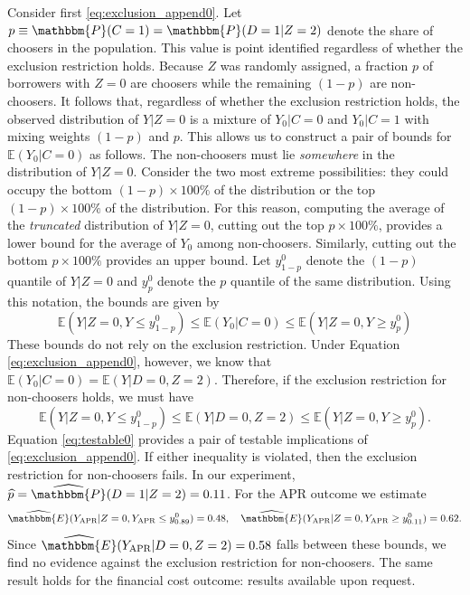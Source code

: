 \begin{appendix}
Consider first \eqref{eq:exclusion_append0}.
Let $p \equiv \mathbbm{P}(C=1) = \mathbbm{P}(D=1|Z=2)$ denote the share of choosers in the population.
This value is point identified regardless of whether the exclusion restriction holds.
Because $Z$ was randomly assigned, a fraction $p$ of borrowers with $Z=0$ are choosers while the remaining $(1-p)$ are non-choosers.
It follows that, regardless of whether the exclusion restriction holds, the observed distribution of $Y|Z=0$ is a mixture of $Y_0|C=0$ and $Y_0|C=1$ with mixing weights $(1-p)$ and $p$.
This allows us to construct a pair of bounds for $\mathbb{E}(Y_0|C=0)$ as follows.
The non-choosers must lie \emph{somewhere} in the distribution of $Y|Z=0$.
Consider the two most extreme possibilities: they could occupy the bottom $(1-p)\times 100\%$ of the distribution or the top $(1-p)\times 100\%$ of the distribution.
For this reason, computing the average of the \emph{truncated} distribution of $Y|Z=0$, cutting out the top $p\times 100\%$, provides a lower bound for the average of $Y_0$ among non-choosers.
Similarly, cutting out the bottom $p \times 100\%$ provides an upper bound.
Let $y^0_{1-p}$ denote the $(1-p)$ quantile of $Y|Z=0$ and $y^0_{p}$ denote the $p$ quantile of the same distribution.
Using this notation, the bounds are given by
\[
\mathbb{E}\left(Y|Z=0, Y\leq y^0_{1-p}\right)\leq \mathbb{E}(Y_0|C=0) \leq \mathbb{E}\left(Y|Z=0, Y \geq y^0_p\right) 
\]
These bounds do not rely on the exclusion restriction.
Under Equation \ref{eq:exclusion_append0}, however, we know that $\mathbb{E}(Y_0|C=0)=\mathbb{E}(Y|D=0,Z=2)$.
Therefore, if the exclusion restriction for non-choosers holds, we must have
\begin{equation}
\mathbb{E}\left(Y|Z=0, Y\leq y^0_{1-p}\right)\leq \mathbb{E}(Y|D=0,Z=2) \leq \mathbb{E}\left(Y|Z=0, Y \geq y^0_p\right).
\label{eq:testable0}
\end{equation}
Equation \ref{eq:testable0} provides a pair of testable implications of \eqref{eq:exclusion_append0}.
If either inequality is violated, then the exclusion restriction for non-choosers fails.
In our experiment, $\widehat{p} = \widehat{\mathbbm{P}}(D=1|Z=2) = 0.11$. For the APR outcome we estimate
\[
\widehat{\mathbbm{E}}(Y_\text{APR}|Z=0,Y_\text{APR}\leq y^0_{0.89}) = 0.48, \quad
\widehat{\mathbbm{E}}(Y_\text{APR}|Z=0, Y_\text{APR}\geq y^0_{0.11}) = 0.62.
\]
Since $\widehat{\mathbbm{E}}(Y_\text{APR}|D=0,Z=2) = 0.58$ falls between these bounds, we find no evidence against the exclusion restriction for non-choosers. 
The same result holds for the financial cost outcome: results available upon request. 


\end{appendix}
